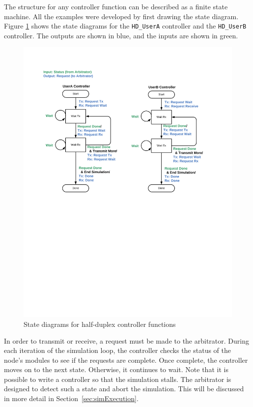 The structure for any controller function can be described as a
finite state machine.  All the examples were developed by first
drawing the state diagram.  Figure \ref{fig:hdState} shows the state
diagrams for the \verb+HD_UserA+ controller and the \verb+HD_UserB+
controller. The outputs are shown in blue, and the inputs are shown
in green.

\begin{figure}[h]
\centering
\includegraphics[width=5in]{figs/HD_State_Diagram}
\caption{State diagrams for half-duplex controller functions}
\label{fig:hdState}
\end{figure}

In order to transmit or receive, a request must be made to the
arbitrator.  During each iteration of the simulation loop, the
controller checks the status of the node's modules to see if the
requests are complete.  Once complete, the controller moves on to
the next state.  Otherwise, it continues to wait.  Note that it is
possible to write a controller so that the simulation stalls.  The
arbitrator is designed to detect such a state and abort the
simulation.  This will be discussed in more detail in
Section~\ref{sec:simExecution}.

